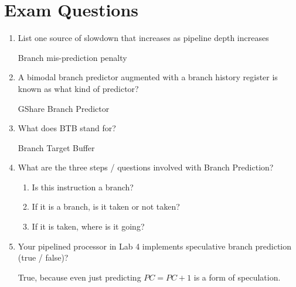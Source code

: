 \documentclass[12pt]{article}
\newenvironment{QandA}{\begin{enumerate}[label=\bfseries\arabic*.]\bfseries}
                      {\end{enumerate}}
\newenvironment{answered}{\par\quad\normalfont}{}
\begin{document}
\newpage 

\section{Exam Questions}
\begin{QandA}
\item List one source of slowdown that increases as pipeline depth increases
\begin{answered}
Branch mis-prediction penalty
\end{answered}

\item A bimodal branch predictor augmented with a branch history register is known as what kind of predictor?
\begin{answered}
GShare Branch Predictor
\end{answered}

\item What does BTB stand for?
\begin{answered}
Branch Target Buffer
\end{answered}

\item What are the three steps / questions involved with Branch Prediction?
\vspace{-0.85cm}
\begin{answered}
\begin{enumerate}
    \item Is this instruction a branch?
    \item If it is a branch, is it taken or not taken?
    \item If it is taken, where is it going?
\end{enumerate}
\end{answered}

\item Your pipelined processor in Lab 4 implements speculative branch prediction (true / false)?
\begin{answered}
True, because even just predicting $PC=PC+1$ is a form of speculation.  
\end{answered}

\end{QandA}
\end{document}
